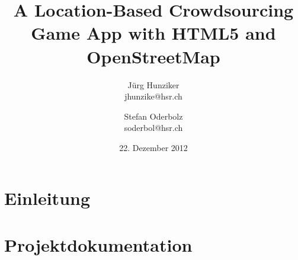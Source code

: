 


\title{A Location-Based Crowdsourcing Game App with HTML5 and OpenStreetMap}
\author{Jürg Hunziker\\jhunzike@hsr.ch
		\and
		Stefan Oderbolz\\soderbol@hsr.ch}
\date{22. Dezember 2012}






\listoftodos









\tableofcontents

\cleardoublepage


\part{Einleitung}


\cleardoublepage

\part{Projektdokumentation}


\cleardoublepage

